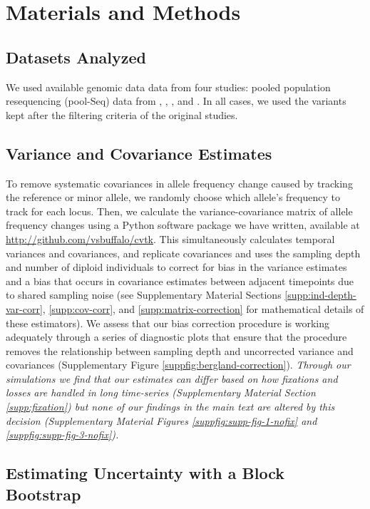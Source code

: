 \documentclass[11pt]{article}
\newcommand{\vb}[1]{{\it \color{blue} #1}}
\begin{document}
\section{Materials and Methods}

\subsection{Datasets Analyzed}

We used available genomic data data from four studies: pooled population
resequencing (pool-Seq) data from \textcite{Barghi2019-qy},
\textcite{Kelly2019-dc}, \textcite{Bergland2014-ij}, and
\textcite{Castro2019-uk}. In all cases, we used the variants kept after the
filtering criteria of the original studies. 

\subsection{Variance and Covariance Estimates}

To remove systematic covariances in allele frequency change caused by tracking
the reference or minor allele, we randomly choose which allele's frequency to
track for each locus. Then, we calculate the variance-covariance matrix of
allele frequency changes using a Python software package we have written,
available at \url{http://github.com/vsbuffalo/cvtk}. This simultaneously
calculates temporal variances and covariances, and replicate covariances and
uses the sampling depth and number of diploid individuals to correct for bias
in the variance estimates and a bias that occurs in covariance estimates
between adjacent timepoints due to shared sampling noise (see Supplementary
Material Sections \ref{supp:ind-depth-var-corr}, \ref{supp:cov-corr}, and
\ref{supp:matrix-correction} for mathematical details of these estimators). We
assess that our bias correction procedure is working adequately through a
series of diagnostic plots that ensure that the procedure removes the
relationship between sampling depth and uncorrected variance and covariances
(Supplementary Figure \ref{suppfig:bergland-correction}).  \vb{Through our
  simulations we find that our estimates can differ based on how fixations and
  losses are handled in long time-series (Supplementary Material Section
  \ref{supp:fixation}) but none of our findings in the main text are altered by
  this decision (Supplementary Material Figures \ref{suppfig:supp-fig-1-nofix}
  and \ref{suppfig:supp-fig-3-nofix}).}


\subsection{Estimating Uncertainty with a Block Bootstrap}
\end{document}
